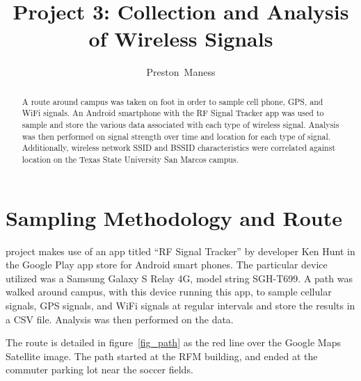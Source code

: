 \documentclass[journal,twocolumn]{IEEEtran}
\begin{document}
\title{Project 3: Collection and Analysis of Wireless Signals}
\author{Preston~Maness}

%
{}

\maketitle

\begin{abstract}
A route around campus was taken on foot in order to sample cell phone, GPS, 
and WiFi signals. An Android smartphone with the RF Signal Tracker 
app was used to sample and store the various data associated with each type 
of wireless signal. Analysis was then performed on signal strength over 
time and location for each type of signal. Additionally, wireless network
SSID and BSSID characteristics were correlated against location on the 
Texas State University San Marcos campus.

\end{abstract}

\section{Sampling Methodology and Route}
 project makes use of an app titled ``RF Signal Tracker'' 
by developer Ken Hunt in the Google Play app store for Android smart phones. 
The particular device utilized was a Samsung Galaxy S Relay 4G, model string 
SGH-T699. A path was walked around campus, with this device running this app,
to sample cellular signals, GPS signals, and WiFi signals at regular intervals
and store the results in a CSV file. Analysis was then performed on the data.

The route is detailed in figure~\ref{fig_path} as the red line over the Google
Maps Satellite image. The path started at the RFM building, and ended at the
commuter parking lot near the soccer fields.
\end{document}
